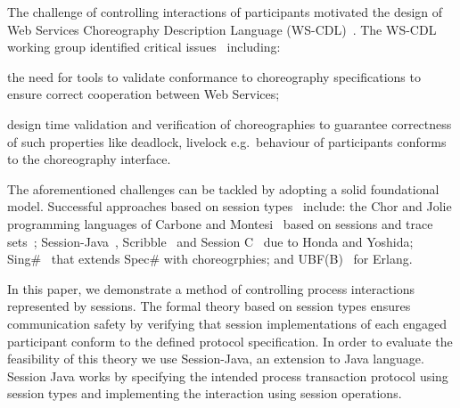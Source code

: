 \documentclass[10pt]{llncs}
\begin{document}

The challenge of controlling interactions of participants motivated the design of Web Services Choreography Description Language (WS-CDL)~\cite{session-types-sessions}.
The WS-CDL working group identified critical issues~\cite{ws-critical-overview} including:
\begin{compactenum}
	\item the need for tools to validate conformance to choreography specifications to ensure correct cooperation between Web Services;
	\item design time validation and verification of choreographies to guarantee correctness of such properties like deadlock, livelock e.g.\ behaviour of participants conforms to the choreography interface.
\end{compactenum}

The aforementioned challenges can be tackled by adopting a solid foundational model. Successful approaches based on session types~\cite{session-types-sessions,carbone2007structured} include: the Chor and Jolie programming languages of Carbone and Montesi~\cite{chor-lang,carbone2013deadlock} based on sessions and trace sets~\cite{chor-essence}; Session-Java~\cite{sj-lang}, Scribble~\cite{honda2011scribbling} and Session C~\cite{ng2012multiparty} due to Honda and Yoshida; Sing\#~\cite{basu2012deciding} that extends Spec\# with choreogrphies; and UBF(B)~\cite{armstrong2002getting} for Erlang.

In this paper, we demonstrate a method of controlling process interactions represented by sessions. The formal theory based on session types ensures communication safety by verifying that session implementations of each engaged participant conform to the defined protocol specification. In order to evaluate the feasibility of this theory we use Session-Java, an extension to Java language. Session Java works by specifying the intended process transaction protocol using session types and implementing the interaction using session operations.
\end{document}
